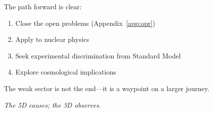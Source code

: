 The path forward is clear:
\begin{enumerate}[nosep]
\item Close the open problems (Appendix~\ref{app:opr})
\item Apply to nuclear physics
\item Seek experimental discrimination from Standard Model
\item Explore cosmological implications
\end{enumerate}

The weak sector is not the end---it is a waypoint on a larger journey.

\bigskip

\begin{center}
\textit{The 5D causes; the 3D observes.}
\end{center}
